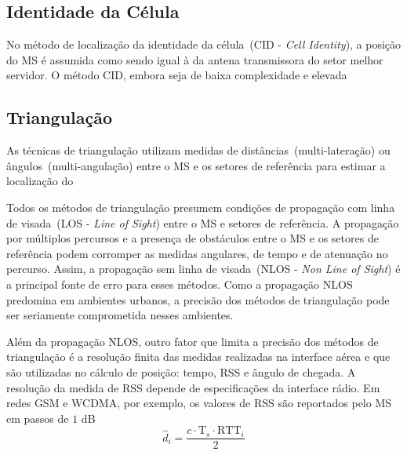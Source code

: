 \subsection{Identidade da Célula}
\label{subsec:Cap1Cid}

No método de localização da identidade da célula~(CID - \textit{Cell Identity}), a posição do MS é assumida como sendo igual à da antena transmissora do setor melhor servidor. O método CID, embora seja de baixa complexidade e elevada 

\subsection{Triangulação}
\label{subsec:Cap1Triangulacao}

As técnicas de triangulação utilizam medidas de distâncias~(multi-lateração) ou ângulos~(multi-angulação) entre o MS e os setores de referência para estimar a localização do 

Todos os métodos de triangulação presumem condições de propagação com linha de visada~(LOS - \textit{Line of Sight}) entre o MS e setores de referência. A propagação por múltiplos percursos e a presença de obstáculos entre o MS e os setores de referência podem corromper as medidas angulares, de tempo e de atenuação no percurso. Assim, a propagação sem linha de visada~(NLOS - \textit{Non Line of Sight}) é a principal fonte de erro para esses métodos. Como a propagação NLOS predomina em ambientes urbanos, a precisão dos métodos de triangulação pode ser seriamente comprometida nesses ambientes.

Além da propagação NLOS, outro fator que limita a precisão dos métodos de triangulação é a resolução finita das medidas realizadas na interface aérea e que são utilizadas no cálculo de posição: tempo, RSS e ângulo de chegada. A resolução da medida de RSS depende de especificações da interface rádio. Em redes GSM e WCDMA, por exemplo, os valores de RSS são reportados pelo MS em passos de $1$ dB~\cite{MURRAY}
\begin{equation}
\label{eq:dist}
\hat{d}_{i}= \frac{c \cdot \textrm{T}_{s} \cdot \textrm{RTT}_{i}}{2}
\end{equation}


